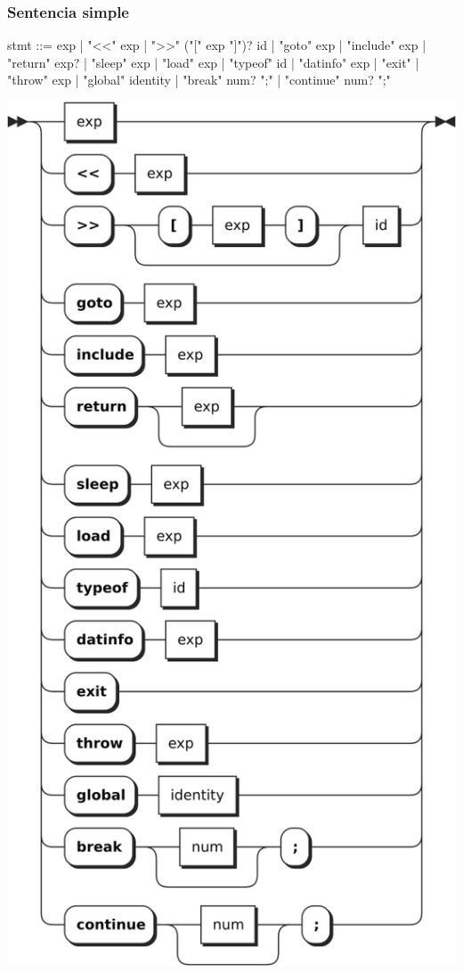 \subsubsection{Sentencia simple}
\begin{multicols}{2}
\begin{myverbatim}
stmt  ::=   exp
         |  "<<" exp
         |  ">>" ("[" exp "]")? id
         |  "goto" exp
         |  "include" exp
         |  "return" exp?
         |  "sleep" exp 
         |  "load" exp 
         |  "typeof" id 
         |  "datinfo" exp
         |  "exit"
         |  "throw" exp
         |  "global" identity
         |  "break" num? ";"
         |  "continue" num? ";"
\end{myverbatim}  	
\columnbreak
\begin{center}
\includegraphics[scale=0.6]{diagram/stmt.png} \\
\end{center}
\end{multicols}

